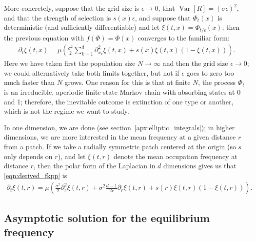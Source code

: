 \documentclass{article}
\DeclareMathOperator{\var}{Var}
\begin{document}
More concretely, suppose that the grid size is $\epsilon \to 0$, 
that $\var[R] = (\sigma \epsilon)^2$, and that the strength of selection is $s(x) \epsilon$,
and suppose that $\Phi_t(x)$ is deterministic (and sufficiently differentiable) and let $\xi(t,x) = \Phi_{t/\epsilon}(x)$;
then the previous equation with $f(\Phi) = \Phi(x)$ converges to the familiar form:
\begin{align}
  \label{eqn:derived_fkpp}
  \partial_t \xi(t,x) = \mu \left( \frac{\sigma^2}{2} \sum_{k=1}^d \partial_{x_k}^2 \xi(t,x) + s(x) \xi(t,x) (1-\xi(t,x)) \right) .
\end{align}
Here we have taken first the population size $N \to \infty$ and then the grid size $\epsilon \to 0$;
we could alternatively take both limits together, but not if $\epsilon$ goes to zero too much faster than $N$ grows.
One reason for this is that at finite $N$,
the process $\Phi_t$ is an irreducible, aperiodic finite-state Markov chain with absorbing states at 0 and 1;
therefore, the inevitable outcome is extinction of one type or another,
which is not the regime we want to study.

In one dimension, we are done (see section~\ref{apx:elliptic_integrals});
in higher dimensions, we are more interested in the mean frequency at a given distance $r$ from a patch.
If we take a radially symmetric patch centered at the origin (so $s$ only depends on $r$), 
and let $\xi(t,r)$ denote the mean occupation frequency at distance $r$,
then the polar form of the Laplacian in $d$ dimensions gives us that \eqref{eqn:derived_fkpp} is
\begin{align}
  \label{eqn:radial_fkpp}
  \partial_t \xi(t,r) = \mu \left( \frac{\sigma^2}{2} \partial_{r}^2 \xi(t,r) + \sigma^2\frac{d-1}{2r} \partial_r \xi(t,r) + s(r) \xi(t,r) (1-\xi(t,r)) \right) .
\end{align}


\subsection[Asymptotics]{Asymptotic solution for the equilibrium frequency} 
\label{apx:asymptotics}
\end{document}
